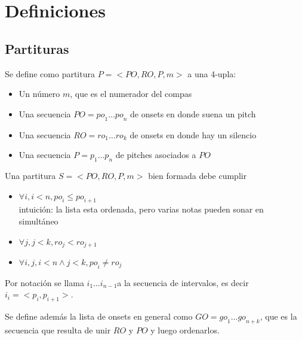 
\newcommand{\po}{\ensuremath{po}}
\newcommand{\PitchOnsets}{\ensuremath{\po_1 \ldots \po_n}}

\newcommand{\ro}{\ensuremath{ro}}
\newcommand{\RestOnsets}{\ensuremath{\ro_1 \ldots \ro_k}}

\newcommand{\go}{\ensuremath{go}}
\newcommand{\GeneralOnsets}{\ensuremath{\go_1 \ldots \go_{n+k}}}

\newcommand{\Pitches}{\ensuremath{p_1 \ldots p_n}}

\newcommand{\Intervals}{\ensuremath{i_1 \ldots i_{n-1}}}

\newcommand{\Score}{\ensuremath{<PO, RO, P, m>}}

\section{Definiciones}
\subsection{Partituras}
Se define como partitura $P = \Score$ a una 4-upla:
\begin{itemize}
    \item Un n\'umero $m$, que es el numerador del compas
    \item Una secuencia $PO = \PitchOnsets$ de onsets en donde suena un pitch 
    \item Una secuencia $RO = \RestOnsets$ de onsets en donde hay un silencio 
    \item Una secuencia $P = \Pitches$ de pitches asociados a $PO$ 
\end{itemize} 

Una partitura $S = \Score$ bien formada debe cumplir
\begin{itemize}
    \item $\forall i, i<n, \po_i \leq \po_{i+1}$\\
        intuici\'on: la lista esta ordenada, pero varias notas pueden sonar en simult\'aneo
    \item $\forall j, j<k, \ro_j < \ro_{j+1}$
    \item $\forall i,j, i<n \land j<k, \po_i \neq ro_j$ 
\end{itemize}

Por notaci\'on se llama \Intervals a la secuencia de intervalos, es decir $i_i = <p_i, p_{i+1}>$.\newline

Se define adem\'as la lista de onsets en general como $GO = \GeneralOnsets$, que es la secuencia
que resulta de unir $RO$ y $PO$ y luego ordenarlos.
